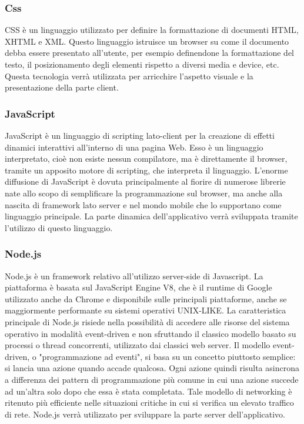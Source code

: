 \subsubsection{Css}
CSS è un linguaggio utilizzato per definire la formattazione di documenti HTML, XHTML e XML.
Questo linguaggio istruisce un browser su come il documento debba essere presentato all'utente, per esempio definendone la formattazione del testo, il posizionamento degli elementi rispetto a diversi media e device, etc.
Questa tecnologia verrà utilizzata per arricchire l'aspetto visuale e la presentazione della parte client.

\subsubsection{JavaScript}
JavaScript è un linguaggio di scripting lato-client per la creazione di effetti dinamici interattivi all'interno di una pagina Web. Esso è un linguaggio interpretato, cioè non esiste nessun compilatore, ma è direttamente il browser, tramite un apposito motore di scripting, che interpreta il linguaggio.
L'enorme diffusione di JavaScript è dovuta principalmente al fiorire di numerose librerie nate allo scopo di semplificare la programmazione sul browser, ma anche alla nascita di framework lato server e nel mondo mobile che lo supportano come linguaggio principale.
La parte dinamica dell'applicativo verrà sviluppata tramite l'utilizzo di questo linguaggio.

\subsubsection{Node.js}
Node.js è un framework relativo all'utilizzo server-side di Javascript.
La piattaforma è basata sul JavaScript Engine V8, che è il runtime di Google utilizzato anche da Chrome e disponibile sulle principali piattaforme, anche se maggiormente performante su sistemi operativi UNIX-LIKE.
La caratteristica principale di Node.js risiede nella possibilità di accedere alle risorse del sistema operativo in modalità event-driven e non sfruttando il classico modello basato su processi o thread concorrenti, utilizzato dai classici web server.
Il modello event-driven, o "programmazione ad eventi", si basa su un concetto piuttosto semplice: si lancia una azione quando accade qualcosa. Ogni azione quindi risulta asincrona a differenza dei pattern di programmazione più comune in cui una azione succede ad un'altra solo dopo che essa è stata completata.
Tale modello di networking è ritenuto più efficiente nelle situazioni critiche in cui si verifica un elevato traffico di rete.
Node.js verrà utilizzato per sviluppare la parte server dell'applicativo.



